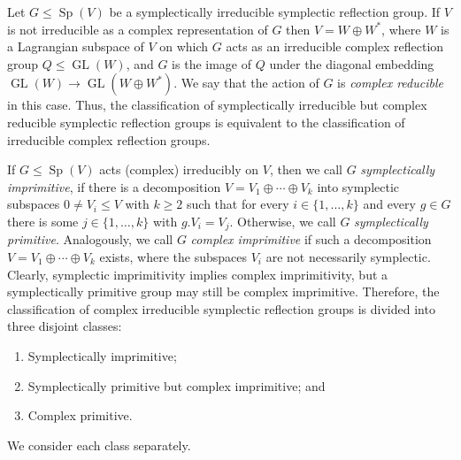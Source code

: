 \documentclass[10pt,a4paper]{amsart}
\DeclareMathOperator{\GL}{GL}
\DeclareMathOperator{\Sp}{Sp}
\begin{document}
Let \(G\leqslant\Sp(V)\) be a symplectically irreducible symplectic reflection group.
If $V$ is not irreducible as a complex representation of \(G\) then $V = W \oplus W^\ast$, where $W$ is a Lagrangian subspace of $V$ on which $G$ acts as an irreducible complex reflection group \(Q \leqslant \GL(W) \), and $G$ is the image of $Q$ under the diagonal embedding \(\GL(W) \to \GL(W \oplus W^\ast)\). We say that the action of $G$ is \emph{complex reducible} in this case. Thus, the classification of symplectically irreducible but complex reducible symplectic reflection groups is equivalent to the classification of irreducible complex reflection groups.

If \(G\leqslant\Sp(V)\) acts (complex) irreducibly on \(V\), then we call \(G\) \emph{symplectically imprimitive}, if there is a decomposition \(V = V_1\oplus \cdots \oplus V_k\) into symplectic subspaces \(0\neq V_i\leqslant V\) with $k \geqslant 2$ such that for every \(i\in \{1,\dots, k\}\) and every \(g\in G\) there is some \(j\in\{1,\dots, k\}\) with \(g.V_i = V_j\). Otherwise, we call \(G\) \emph{symplectically primitive}. Analogously, we call \(G\) \emph{complex imprimitive} if such a decomposition \(V = V_1\oplus \cdots \oplus V_k\) exists, where the subspaces \(V_i\) are not necessarily symplectic.
Clearly, symplectic imprimitivity implies complex imprimitivity, but a symplectically primitive group may still be complex imprimitive. Therefore, the classification of complex irreducible symplectic reflection groups is divided into three disjoint classes:
\begin{enumerate}
	\item[-] Symplectically imprimitive; 
	\item[-] Symplectically primitive but complex imprimitive; and
	\item[-] Complex primitive. 
\end{enumerate}
We consider each class separately. 
\end{document}
